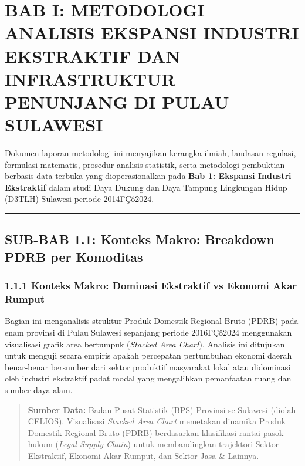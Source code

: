 \documentclass[
]{article}
\author{}
\date{}
\begin{document}
\section{BAB I: METODOLOGI ANALISIS EKSPANSI INDUSTRI EKSTRAKTIF DAN
INFRASTRUKTUR PENUNJANG DI PULAU
SULAWESI}\label{bab-i-metodologi-analisis-ekspansi-industri-ekstraktif-dan-infrastruktur-penunjang-di-pulau-sulawesi}

Dokumen laporan metodologi ini menyajikan kerangka ilmiah, landasan
regulasi, formulasi matematis, prosedur analisis statistik, serta
metodologi pembuktian berbasis data terbuka yang dioperasionalkan pada
\textbf{Bab 1: Ekspansi Industri Ekstraktif} dalam studi Daya Dukung dan
Daya Tampung Lingkungan Hidup (D3TLH) Sulawesi periode 2014ΓÇô2024.

\begin{center}\rule{0.5\linewidth}{0.5pt}\end{center}

\subsection{SUB-BAB 1.1: Konteks Makro: Breakdown PDRB per
Komoditas}\label{sub-bab-1.1-konteks-makro-breakdown-pdrb-per-komoditas}

\subsubsection{1.1.1 Konteks Makro: Dominasi Ekstraktif vs Ekonomi Akar
Rumput}\label{konteks-makro-dominasi-ekstraktif-vs-ekonomi-akar-rumput}

Bagian ini menganalisis struktur Produk Domestik Regional Bruto (PDRB)
pada enam provinsi di Pulau Sulawesi sepanjang periode 2016ΓÇô2024
menggunakan visualisasi grafik area bertumpuk (\emph{Stacked Area
Chart}). Analisis ini ditujukan untuk menguji secara empiris apakah
percepatan pertumbuhan ekonomi daerah benar-benar bersumber dari sektor
produktif masyarakat lokal atau didominasi oleh industri ekstraktif
padat modal yang mengalihkan pemanfaatan ruang dan sumber daya alam.

\begin{quote}
\textbf{Sumber Data:} Badan Pusat Statistik (BPS) Provinsi se-Sulawesi
(diolah CELIOS). Visualisasi \emph{Stacked Area Chart} memetakan
dinamika Produk Domestik Regional Bruto (PDRB) berdasarkan klasifikasi
rantai pasok hukum (\emph{Legal Supply-Chain}) untuk membandingkan
trajektori Sektor Ekstraktif, Ekonomi Akar Rumput, dan Sektor Jasa \&
Lainnya.
\end{quote}
\end{document}
